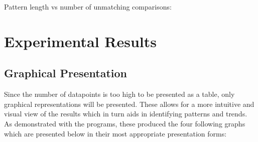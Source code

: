 \documentclass[12pt]{article}
\begin{document}
Pattern length vs number of unmatching comparisons:

\section{Experimental Results}
\subsection{Graphical Presentation}
Since the number of datapoints is too high to be presented as a table, only graphical representations will be presented.
These allows for a more intuitive and visual view of the results which in turn aids in identifying patterns and trends.
As demonstrated with the programs, these produced the four following graphs which are presented below in their most appropriate presentation forms:
\end{document}
